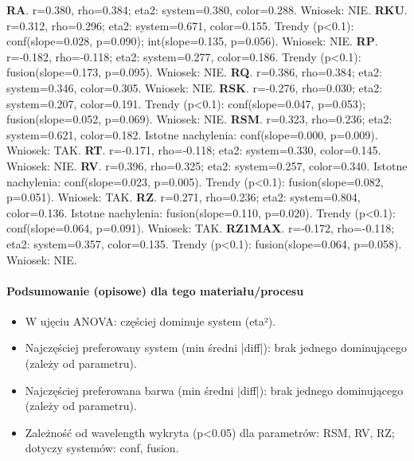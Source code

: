 \documentclass[
  10pt,
]{article}
\begin{document}
\textbf{RA}. r=0.380, rho=0.384; eta2: system=0.380, color=0.288.
Wniosek: NIE. \textbf{RKU}. r=0.312, rho=0.296; eta2: system=0.671,
color=0.155. Trendy (p\textless0.1): conf(slope=0.028, p=0.090);
int(slope=0.135, p=0.056). Wniosek: NIE. \textbf{RP}. r=-0.182,
rho=-0.118; eta2: system=0.277, color=0.186. Trendy (p\textless0.1):
fusion(slope=0.173, p=0.095). Wniosek: NIE. \textbf{RQ}. r=0.386,
rho=0.384; eta2: system=0.346, color=0.305. Wniosek: NIE. \textbf{RSK}.
r=-0.276, rho=0.030; eta2: system=0.207, color=0.191. Trendy
(p\textless0.1): conf(slope=0.047, p=0.053); fusion(slope=0.052,
p=0.069). Wniosek: NIE. \textbf{RSM}. r=0.323, rho=0.236; eta2:
system=0.621, color=0.182. Istotne nachylenia: conf(slope=0.000,
p=0.009). Wniosek: TAK. \textbf{RT}. r=-0.171, rho=-0.118; eta2:
system=0.330, color=0.145. Wniosek: NIE. \textbf{RV}. r=0.396,
rho=0.325; eta2: system=0.257, color=0.340. Istotne nachylenia:
conf(slope=0.023, p=0.005). Trendy (p\textless0.1): fusion(slope=0.082,
p=0.051). Wniosek: TAK. \textbf{RZ}. r=0.271, rho=0.236; eta2:
system=0.804, color=0.136. Istotne nachylenia: fusion(slope=0.110,
p=0.020). Trendy (p\textless0.1): conf(slope=0.064, p=0.091). Wniosek:
TAK. \textbf{RZ1MAX}. r=-0.172, rho=-0.118; eta2: system=0.357,
color=0.135. Trendy (p\textless0.1): fusion(slope=0.064, p=0.058).
Wniosek: NIE.

\paragraph{Podsumowanie (opisowe) dla tego materiału/procesu}
\begin{itemize}
\item W ujęciu ANOVA: częściej dominuje system (eta²).
\item Najczęściej preferowany system (min średni |diff|): brak jednego dominującego (zależy od parametru).
\item Najczęściej preferowana barwa (min średni |diff|): brak jednego dominującego (zależy od parametru).
\item Zależność od wavelength wykryta (p<0.05) dla parametrów: RSM, RV, RZ; dotyczy systemów: conf, fusion.
\end{itemize}
\end{document}
